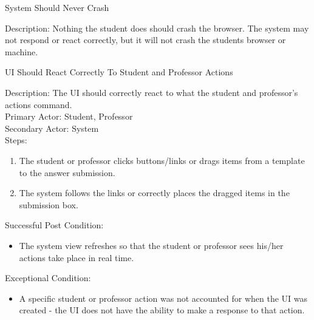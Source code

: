     \begin{section}{System Should Never Crash}
    
    Description: Nothing the student does should crash the browser. The system may not respond or react correctly, but it will not crash the students browser or machine.
    \end{section}
    \begin{section}{ UI Should React Correctly To Student and Professor Actions}
    
    Description: The UI should correctly react to what the student and professor’s actions command.\\
    Primary Actor: Student, Professor\\
    Secondary Actor: System\\
    Steps:
        \begin{enumerate}
            \item The student or professor clicks buttons/links or drags items from a template to the answer submission.
            \item The system follows the links or correctly places the dragged items in the submission box.
            \end{enumerate}
    Successful Post Condition: 
        \begin{itemize}
            \item The system view refreshes so that the student or professor sees his/her actions take place in real time.
        \end{itemize}
    Exceptional Condition:
        \begin{itemize}
            \item A specific student or professor action was not accounted for when the UI was created - the UI does not have the ability to make a response to that action.
        \end{itemize}
    \end{section}
    


